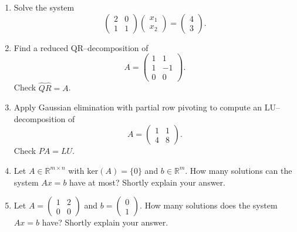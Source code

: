 \vspace*{-0.5cm}
\begin{enumerate}	
	\item Solve the system
	$$\begin{pmatrix}
	2 & 0\\
	1 & 1
	\end{pmatrix}\begin{pmatrix}
	x_1 \\ x_2
	\end{pmatrix} = \begin{pmatrix}
	4 \\ 3
	\end{pmatrix}.  $$
	\item Find a reduced QR--decomposition of 
		$$A = \begin{pmatrix}
	1 & 1\\
	1 & -1 \\
	0 & 0
	\end{pmatrix} .$$
	Check $\widehat{Q}\widehat{R} = A$.
	\item Apply Gaussian elimination with partial row pivoting to compute an LU--decomposition of 
	$$A = \begin{pmatrix}
	1 & 1\\
	4 & 8
	\end{pmatrix} .$$
	Check $PA=LU$.
	\item Let $A \in \mathbb{R}^{m \times n}$ with $\text{ker}(A)=\{0\}$ and $b \in \mathbb{R}^m$. How many solutions can the system $Ax=b$ have at most? Shortly explain your answer.
	\item Let $A = \begin{pmatrix}
	1 & 2\\
	0 & 0
	\end{pmatrix}$ and $b = \begin{pmatrix}
	0\\1
	\end{pmatrix}$. How many solutions does the system $Ax=b$ have? Shortly explain your answer.
\end{enumerate}
 